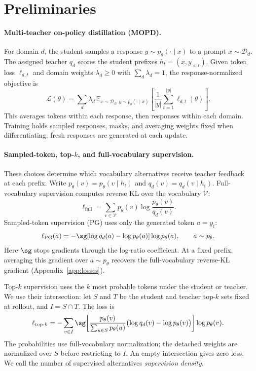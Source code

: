 \section{Preliminaries}
\label{sec:setting}

\paragraph{Multi-teacher on-policy distillation (MOPD).}
For domain $d$, the student samples a response $y\sim p_\theta(\cdot\mid x)$ to a prompt $x\sim\mathcal D_d$. The assigned teacher $q_d$ scores the student prefixes $h_t=(x,y_{<t})$. Given token loss $\ell_{d,t}$ and domain weights $\lambda_d\geq0$ with $\sum_d\lambda_d=1$, the response-normalized objective is
\begin{equation}
\mathcal L(\theta)=\sum_d\lambda_d\,
\mathbb E_{x\sim\mathcal D_d,\,y\sim p_\theta(\cdot\mid x)}
\left[\frac{1}{|y|}\sum_{t=1}^{|y|}\ell_{d,t}(\theta)\right].
\label{eq:mopd}
\end{equation}
This averages tokens within each response, then responses within each domain. Training holds sampled responses, masks, and averaging weights fixed when differentiating; fresh responses are generated at each update.

\paragraph{Sampled-token, top-$k$, and full-vocabulary supervision.}
These choices determine which vocabulary alternatives receive teacher feedback at each prefix. Write $p_\theta(v)=p_\theta(v\mid h_t)$ and $q_d(v)=q_d(v\mid h_t)$. Full-vocabulary supervision computes reverse KL over the vocabulary $\mathcal V$:
\begin{equation}
\ell_{\mathrm{full}}=\sum_{v\in\mathcal V}p_\theta(v)\log\frac{p_\theta(v)}{q_d(v)}.
\label{eq:full}
\end{equation}
Sampled-token supervision (PG) uses only the generated token $a=y_t$:
\begin{equation}
\ell_{\mathrm{PG}}(a)=-\sg[\log q_d(a)-\log p_\theta(a)]\log p_\theta(a),
\qquad a\sim p_\theta.
\label{eq:pg}
\end{equation}
Here $\sg$ stops gradients through the log-ratio coefficient. At a fixed prefix, averaging this gradient over $a\sim p_\theta$ recovers the full-vocabulary reverse-KL gradient (Appendix~\ref{app:losses}).

Top-$k$ supervision uses the $k$ most probable tokens under the student or teacher. We use their intersection: let $S$ and $T$ be the student and teacher top-$k$ sets fixed at rollout, and $I=S\cap T$. The loss is
\begin{equation}
\ell_{\mathrm{top}\text{-}k}=-\sum_{v\in I}\sg\!\left[
\frac{p_\theta(v)}{\sum_{u\in S}p_\theta(u)}
\bigl(\log q_d(v)-\log p_\theta(v)\bigr)\right]\log p_\theta(v).
\label{eq:topk}
\end{equation}
The probabilities use full-vocabulary normalization; the detached weights are normalized over $S$ before restricting to $I$. An empty intersection gives zero loss. We call the number of supervised alternatives \emph{supervision density}.

